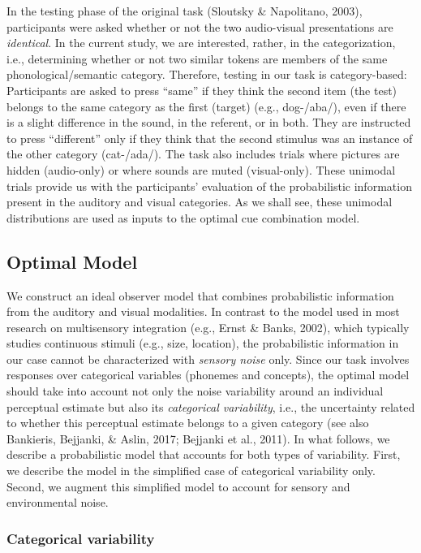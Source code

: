 \documentclass[english,,man,floatsintext]{apa6}
\theoremstyle{definition}
\theoremstyle{definition}
\theoremstyle{definition}
\theoremstyle{remark}
\begin{document}
In the testing phase of the original task (Sloutsky \& Napolitano,
2003), participants were asked whether or not the two audio-visual
presentations are \emph{identical}. In the current study, we are
interested, rather, in the categorization, i.e., determining whether or
not two similar tokens are members of the same phonological/semantic
category. Therefore, testing in our task is category-based: Participants
are asked to press \enquote{same} if they think the second item (the
test) belongs to the same category as the first (target) (e.g.,
dog-/aba/), even if there is a slight difference in the sound, in the
referent, or in both. They are instructed to press \enquote{different}
only if they think that the second stimulus was an instance of the other
category (cat-/ada/). The task also includes trials where pictures are
hidden (audio-only) or where sounds are muted (visual-only). These
unimodal trials provide us with the participants' evaluation of the
probabilistic information present in the auditory and visual categories.
As we shall see, these unimodal distributions are used as inputs to the
optimal cue combination model.

\subsection{Optimal Model}\label{optimal-model}

We construct an ideal observer model that combines probabilistic
information from the auditory and visual modalities. In contrast to the
model used in most research on multisensory integration (e.g., Ernst \&
Banks, 2002), which typically studies continuous stimuli (e.g., size,
location), the probabilistic information in our case cannot be
characterized with \emph{sensory noise} only. Since our task involves
responses over categorical variables (phonemes and concepts), the
optimal model should take into account not only the noise variability
around an individual perceptual estimate but also its \emph{categorical
variability}, i.e., the uncertainty related to whether this perceptual
estimate belongs to a given category (see also Bankieris, Bejjanki, \&
Aslin, 2017; Bejjanki et al., 2011). In what follows, we describe a
probabilistic model that accounts for both types of variability. First,
we describe the model in the simplified case of categorical variability
only. Second, we augment this simplified model to account for sensory
and environmental noise.

\subsubsection{Categorical variability}\label{categorical-variability}
\end{document}

